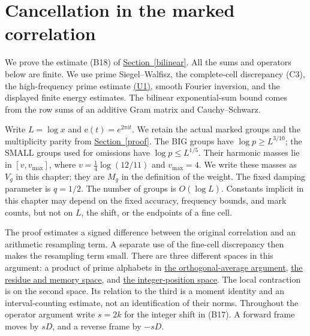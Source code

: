 \hypertarget{marked-correlation}{%
\section{Cancellation in the marked
correlation}\label{marked-correlation}}

We prove the estimate (B18) of
\protect\hyperlink{bilinear}{Section~\ref{bilinear}}. All the sums and
operators below are finite. We use prime Siegel--Walfisz, the
complete-cell discrepancy (C3), the high-frequency prime estimate
\protect\hyperlink{local-energy-the-high-frequency-prime-input}{(U1)},
smooth Fourier inversion, and the displayed finite energy estimates. The
bilinear exponential-sum bound comes from the row sums of an additive
Gram matrix and Cauchy--Schwarz.

Write \(L=\log x\) and \(\mathrm e(t)=e^{2\pi it}\). We retain the
actual marked groups and the multiplicity parity from
\protect\hyperlink{proof}{Section~\ref{proof}}. The BIG groups have
\(\log p\ge L^{3/10}\); the SMALL groups used for omissions have
\(\log p\le L^{1/5}\). Their harmonic masses lie in \([v,v_{\max}]\),
where \(v=\tfrac14\log(12/11)\) and \(v_{\max}=4\). We write these
masses as \(V_g\) in this chapter; they are \(M_g\) in the definition of
the weight. The fixed damping parameter is \(q=1/2\). The number of
groups is \(O(\log L)\). Constants implicit in this chapter may depend
on the fixed accuracy, frequency bounds, and mark counts, but not on
\(L\), the shift, or the endpoints of a fine cell.

The proof estimates a signed difference between the original correlation
and an arithmetic resampling term. A separate use of the fine-cell
discrepancy then makes the resampling term small. There are three
different spaces in this argument: a product of prime alphabets in
\protect\hyperlink{marked-correlation-orthogonal-averages-and-the-alternating-identity}{the
orthogonal-average argument},
\protect\hyperlink{marked-correlation-the-arithmetic-state-space-and-the-local-contraction}{the
residue and memory space}, and
\protect\hyperlink{marked-correlation-from-residue-averages-to-the-integer-interval}{the
integer-position space}. The local contraction is on the second space.
Its relation to the third is a moment identity and an interval-counting
estimate, not an identification of their norms. Throughout the operator
argument write \(s=2k\) for the integer shift in (B17). A forward frame
moves by \(sD\), and a reverse frame by \(-sD\).


